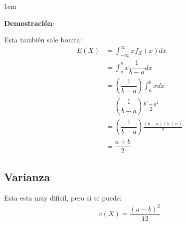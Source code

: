 \documentclass[12pt, fleqn]{report}                             %
\newenvironment{SmallIndentation}[1][0.75em]                    %
        {\begin{adjustwidth}{#1}{}\begin{footnotesize}}             %
        {\end{footnotesize}\end{adjustwidth}}                       %
\theoremstyle{break}                                            %
\newcommand{\Wrap}[1]           {\left( #1 \right)}             %
\newcommand{\pfrac}[2]      {\Wrap{\dfrac{#1}{#2}}}             %
\begin{document}
                \begin{SmallIndentation}[1em]
                    \textbf{Demostración}:
                    
                    Esta también sale bonita:
                    \begin{align*}
                        E(X)
                            &= \int_{-\infty}^\infty x f_X (x) dx           \\
                            &= \int_a^b x \dfrac{1}{b-a} dx                 \\
                            &= \pfrac{1}{b-a} \int_a^b x  dx                \\
                            &= \pfrac{1}{b-a} \frac{b^2 - a^2}{2}           \\
                            &= \pfrac{1}{b-a} \frac{(b-a)(b+a)}{2}          \\
                            &= \dfrac{a+b}{2}
                    \end{align*}
                    
                \end{SmallIndentation}

            \clearpage
            \subsection{Varianza}

                Esta esta muy dificíl, pero si se puede:
                \begin{align*}
                    v(X) = \dfrac{(a-b)^2}{12}
                \end{align*}
\end{document}

